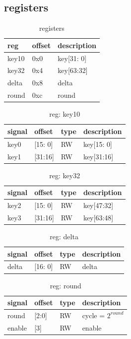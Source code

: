 \documentclass[10pt]{article}
\begin{document}
\subsection{registers}

\begin{table}[H]
\begin{tabular}[width=\textwidth]{|l|l|l|}
\hline
reg                        &offset	 &description \\
\hline
key10                      &0x0      &key[31: 0]  \\
key32                      &0x4      &key[63:32]  \\
delta                      &0x8      &delta       \\
round                      &0xc      &round       \\
\hline
\end{tabular}
\label{t1}
\caption{registers}
\end{table}

\begin{table}[H]
\begin{tabular}[width=\textwidth]{|l|l|l|l|}
\hline
signal        &offset   &type &description   \\
\hline
key0           &[15: 0]    &RW   &key[15: 0] \\
key1           &[31:16]    &RW   &key[31:16] \\
\hline
\end{tabular}
\label{t1}
\caption{reg: key10}
\end{table}

\begin{table}[H]
\begin{tabular}[width=\textwidth]{|l|l|l|l|}
\hline
signal        &offset   &type &description   \\
\hline
key2           &[15: 0]    &RW   &key[47:32] \\
key3           &[31:16]    &RW   &key[63:48] \\
\hline
\end{tabular}
\label{t1}
\caption{reg: key32}
\end{table}


\begin{table}[H]
\begin{tabular}[width=\textwidth]{|l|l|l|l|}
\hline
signal        &offset   &type &description \\
\hline
delta         &[16: 0]  &RW   &delta \\
\hline
\end{tabular}
\label{t1}
\caption{reg: delta}
\end{table}


\begin{table}[H]
\begin{tabular}[width=\textwidth]{|l|l|l|l|}
\hline
signal        &offset   &type &description \\
\hline
round         &[2:0]    &RW  &cycle = $2^{round}$ \\
enable        &[3]      &RW  &enable \\
\hline
\end{tabular}
\label{t1}
\caption{reg: round}
\end{table}
\end{document}
